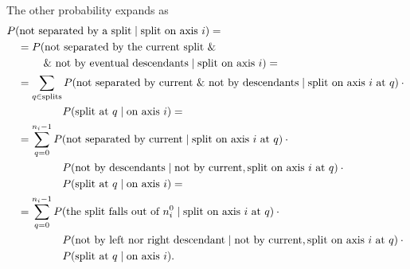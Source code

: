 \documentclass[a4paper]{article}
\theoremstyle{definition}
\begin{document}
    The other probability expands as
    \begin{align}
        &P(\text{not separated by a split}\mid\text{split on axis $i$}) = \notag \\
        &\quad= P(\text{not separated by the current split \&} \notag \\
        &\quad\phantom{=P(\,} \text{\& not by eventual descendants}\mid \text{split on axis $i$}) = \notag \\
        &\quad= \sum_{q \in \text{splits}}
        P(\text{not separated by current \& not by descendants}\mid \text{split on axis $i$ at $q$}) \cdot {} \notag \\
        &\quad\hphantom{= \sum_{q \in \text{splits}}\,\,}
        P(\text{split at $q$}\mid\text{on axis $i$}) = \notag \\
        &\quad= \sum_{q=0}^{n_i-1}
        P(\text{not separated by current}\mid \text{split on axis $i$ at $q$}) \cdot {} \notag \\
        &\quad\hphantom{= \sum_{q \in \text{splits}}\,\,}
        P(\text{not by descendants} \mid \text{not by current}, \text{split on axis $i$ at $q$}) \cdot {} \notag \\
        &\quad\hphantom{= \sum_{q \in \text{splits}}\,\,}
        P(\text{split at $q$} \mid \text{on axis $i$}) = \notag \\
        &\quad= \sum_{q=0}^{n_i-1}
        P(\text{the split falls out of $n^0_i$}\mid\text{split on axis $i$ at $q$}) \cdot {} \notag \\
        &\quad\hphantom{= \sum_{q \in \text{splits}}\,\,}
        P(\text{not by left nor right descendant}\mid\text{not by current}, \text{split on axis $i$ at $q$}) \cdot {} \notag \\
        &\quad\hphantom{= \sum_{q \in \text{splits}}\,\,}
        P(\text{split at $q$}\mid\text{on axis $i$}). \label{eq:condsplit}
    \end{align}
    
\end{document}
